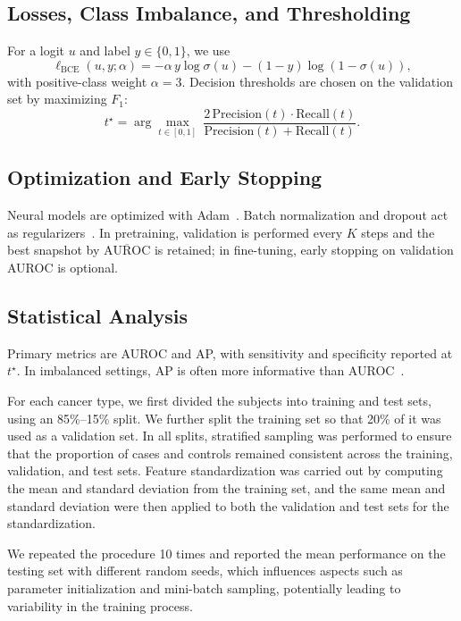 \documentclass[journal,article,submit,pdftex,moreauthors]{Definitions/mdpi}
\begin{document}
\subsection{Losses, Class Imbalance, and Thresholding}
For a logit $u$ and label $y\in\{0,1\}$, we use
\begin{equation}
\ell_{\mathrm{BCE}}(u,y;\alpha)=-\alpha\,y\log\sigma(u)-(1-y)\log(1-\sigma(u)),
\end{equation}
with positive-class weight $\alpha{=}3$. Decision thresholds are chosen on the validation set by maximizing $F_1$:
\begin{equation}
t^\star=\arg\max_{t\in[0,1]}\ \frac{2\,\mathrm{Precision}(t)\cdot\mathrm{Recall}(t)}{\mathrm{Precision}(t)+\mathrm{Recall}(t)}.
\end{equation}

\subsection{Optimization and Early Stopping}
Neural models are optimized with Adam~\citep{Kingma2015_Adam}. Batch normalization and dropout act as regularizers~\citep{Ioffe2015_BN,Srivastava2014_Dropout}. In pretraining, validation is performed every $K$ steps and the best snapshot by $\overline{\mathrm{AUROC}}$ is retained; in fine-tuning, early stopping on validation AUROC is optional.

\subsection{Statistical Analysis}
{\color{red}
Primary metrics are AUROC and AP, with sensitivity and specificity reported at $t^\star$. In imbalanced settings, AP is often more informative than AUROC~\citep{Saito2015_PR}.
}

For each cancer type, we first divided the subjects into training and test sets, using an 85\%--15\% split. 
We further split the training set so that 20\% of it was used as a validation set. 
In all splits, stratified sampling was performed to ensure that the proportion of cases and controls remained consistent across the training, validation, and test sets. 
Feature standardization was carried out by computing the mean and standard deviation from the training set, and the same mean and standard deviation were then applied to both the validation and test sets for the standardization.

We repeated the procedure 10 times and reported the mean performance on the testing set with different random seeds, which influences aspects such as parameter initialization and mini-batch sampling, potentially leading to variability in the training process.
\end{document}
